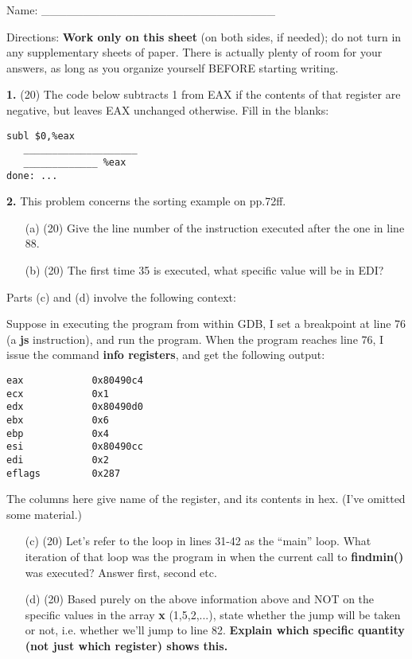 \documentclass[twocolumn]{article}
\begin{document}
Name: \_\_\_\_\_\_\_\_\_\_\_\_\_\_\_\_\_\_\_\_\_\_\_\_\_\_\_\_

Directions: {\bf Work only on this sheet} (on both sides, if needed); do not
turn in any supplementary sheets of paper. There is actually plenty of room
for your answers, as long as you organize yourself BEFORE starting writing.

{\bf 1.} (20) The code below subtracts 1 from EAX if the contents of that
register are negative, but leaves EAX unchanged otherwise.  Fill in the
blanks:

\begin{Verbatim}[fontsize=\relsize{-2}]
   subl $0,%eax
   ____________________
   _____________ %eax
done: ...
\end{Verbatim}

{\bf 2.} This problem concerns the sorting example on pp.72ff.  

\begin{itemize}

\item [(a)] (20) Give the line number of the instruction executed after
the one in line 88.

\item [(b)] (20) The first time 35 is executed, what specific value will
be in EDI?

\end{itemize}

Parts (c) and (d) involve the following context:

Suppose in executing the program from within GDB, I set a breakpoint at
line 76 (a {\bf js} instruction), and run the program.  When the program
reaches line 76, I issue the command {\bf info registers}, and get the
following output:

\begin{Verbatim}[fontsize=\relsize{-2}]
eax            0x80490c4        
ecx            0x1      
edx            0x80490d0        
ebx            0x6      
ebp            0x4      
esi            0x80490cc        
edi            0x2      
eflags         0x287   
\end{Verbatim}

The columns here give name of the register, and its contents in hex.
(I've omitted some material.) 

\begin{itemize}

\item [(c)] (20) Let's refer to the loop in lines 31-42 as the ``main''
loop.  What iteration of that loop was the program in when the current
call to {\bf findmin()} was executed?  Answer first, second etc.

\item [(d)] (20) Based purely on the above information above and NOT on
the specific values in the array {\bf x} (1,5,2,...), state whether the
jump will be taken or not, i.e. whether we'll jump to line 82.  {\bf
Explain which specific quantity (not just which register) shows this.}

\end{itemize}
\end{document}
